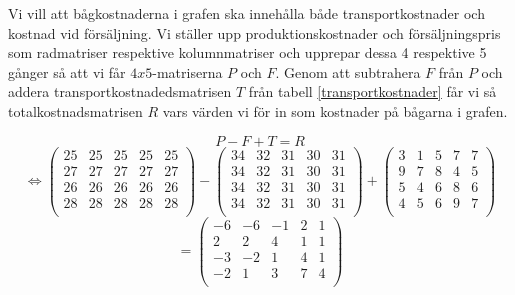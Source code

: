 \documentclass[titlepage, a4paper]{article}
\begin{document}
Vi vill att bågkostnaderna i grafen ska innehålla både transportkostnader och kostnad vid försäljning. Vi ställer upp produktionskostnader och försäljningspris som radmatriser respektive kolumnmatriser och upprepar dessa 4 respektive 5 gånger så att vi får $4x5$-matriserna $P$ och $F$. Genom att subtrahera $F$ från $P$ och addera transportkostnadedsmatrisen $T$ från tabell \ref{transportkostnader} får vi så totalkostnadsmatrisen $R$ vars värden vi för in som kostnader på bågarna i grafen.

\begin{displaymath}
P - F + T = R
\end{displaymath}
\begin{displaymath}
\Leftrightarrow
\begin{pmatrix}
     {25} & {25} & {25} & {25} & {25} \\
     {27} & {27} & {27} & {27} & {27} \\
     {26} & {26} & {26} & {26} & {26} \\
     {28} & {28} & {28} & {28} & {28} \\
\end{pmatrix}
-
\begin{pmatrix}
    {34} & {32} & {31} & {30} & {31} \\
    {34} & {32} & {31} & {30} & {31} \\
    {34} & {32} & {31} & {30} & {31} \\
    {34} & {32} & {31} & {30} & {31} \\
\end{pmatrix}
+
\begin{pmatrix}
    {3} & {1} & {5} & {7} & {7} \\
    {9} & {7} & {8} & {4} & {5} \\
    {5} & {4} & {6} & {8} & {6} \\
    {4} & {5} & {6} & {9} & {7} \\
\end{pmatrix}
\end{displaymath}
\begin{displaymath}
=
\begin{pmatrix}
    {-6} & {-6} & {-1} & {2} & {1} \\
    {2} & {2} & {4} & {1} & {1} \\
    {-3} & {-2} & {1} & {4} & {1} \\
    {-2} & {1} & {3} & {7} & {4} \\
\end{pmatrix}
\end{displaymath}
\end{document}
